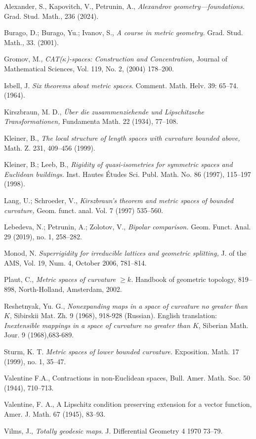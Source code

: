 \begin{thebibliography}{52}
Alexander, S., Kapovitch, V., Petrunin, A.,
\textit{Alexandrov geometry---foundations.}
Grad. Stud. Math., 236 (2024).

 Burago, D.; Burago, Yu.; Ivanov, S., \textit{A course in metric geometry.} Grad. Stud. Math., 33. (2001).

 Gromov, M., \textit{CAT($\kappa$)-spaces: Construction and Concentration,} Journal of Mathematical Sciences, Vol. 119, No. 2, (2004) 178--200.

 Isbell, J. \textit{Six theorems about metric spaces}. Comment. Math. Helv. 39: 65--74.(1964).

 Kirszbraun, M. D., \textit{\"Uber die zusammenziehende und Lipschitzsche Transformationen,} Fundamenta Math. 22 (1934), 77--108.

 Kleiner, B.,  \textit{The local structure of length spaces
with curvature bounded above,} Math. Z. 231, 409--456 (1999).

  Kleiner, B.; Leeb, B., \textit{Rigidity of quasi-isometries for symmetric spaces and Euclidean buildings.} Inst. Hautes \'Etudes Sci. Publ. Math. No. 86 (1997), 115--197 (1998).

  Lang, U.; Schroeder, V., \textit{Kirszbraun's theorem and metric spaces of bounded curvature,} Geom. funct. anal.
Vol. 7 (1997) 535--560.

 Lebedeva, N.;
Petrunin, A.; Zolotov, V., \textit{Bipolar comparison.}
Geom. Funct. Anal. 29 (2019), no. 1, 258--282.


 Monod, N. \textit{Superrigidity for irreducible lattices and geometric splitting,} J. of the AMS,
Vol. 19, Num. 4, October 2006, 781--814.

Plaut, C., \textit{Metric spaces of curvature $\ge k$.}
Handbook of geometric topology,  819--898, North-Holland, Amsterdam, 2002.

Reshetnyak, Yu. G.,
\textit{Nonexpanding maps in a space of curvature no greater than $K$},
Sibirskii Mat. Zh. 9 (1968), 918-928 (Russian).
English translation: \textit{Inextensible mappings in a space of curvature
no greater than $K$}, Siberian Math. Jour. 9 (1968),683-689.


Sturm, K. T. \textit{Metric spaces of lower bounded curvature.}
Exposition. Math.  17  (1999),  no. 1, 35--47.

Valentine F.A., Contractions in non-Euclidean spaces, Bull. Amer. Math. Soc. 50 (1944), 710--713.

Valentine, F. A., A Lipschitz condition preserving extension for a vector
function, Amer. J. Math. 67 (1945), 83--93.

Vilms, J., \textit{Totally geodesic maps}.
J. Differential Geometry 4 1970 73--79.
\end{thebibliography}
